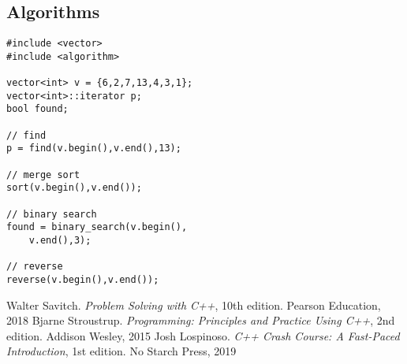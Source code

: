 \documentclass[10pt]{article}
\begin{document}
\begin{multicols*}{3}
\section*{Algorithms}
\small
\begin{lstlisting}
#include <vector>
#include <algorithm>

vector<int> v = {6,2,7,13,4,3,1};
vector<int>::iterator p;
bool found;

// find
p = find(v.begin(),v.end(),13);

// merge sort
sort(v.begin(),v.end());

// binary search
found = binary_search(v.begin(),
    v.end(),3);

// reverse
reverse(v.begin(),v.end());
\end{lstlisting}
%
%
\small
\begin{thebibliography}{99}
 Walter Savitch. \textsl{Problem Solving with C++}, 10th edition. Pearson Education, 2018
 Bjarne Stroustrup. \textsl{Programming: Principles and Practice Using C++}, 2nd edition. Addison Wesley, 2015
 Josh Lospinoso. \textsl{C++ Crash Course: A Fast-Paced Introduction}, 1st edition. No Starch Press, 2019
\end{thebibliography}
\end{multicols*}
\end{document}
